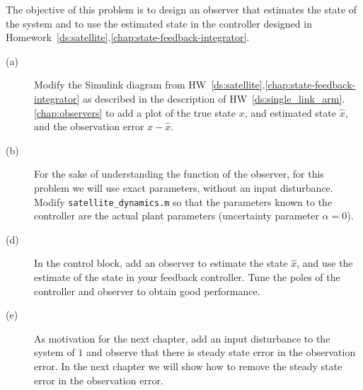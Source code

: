 
The objective of this problem is to design an observer that estimates the state of the system and to use the estimated state in the controller designed in Homework~\ref{ds:satellite}.\ref{chap:state-feedback-integrator}.
\begin{description}\item[]
\item[(a)] Modify the Simulink diagram from HW~\ref{ds:satellite}.\ref{chap:state-feedback-integrator} as described in the description of HW~\ref{ds:single_link_arm}.\ref{chap:observers} to add a plot of the true state $x$, and estimated state $\hat{x}$, and the observation error $x-\hat{x}$.
\item[(b)] For the sake of understanding the function of the observer, for this problem we will use exact parameters, without an input disturbance.  Modify {\tt  satellite\_dynamics.m} so that the parameters known to the controller are the actual plant parameters (uncertainty parameter $\alpha=0$).
\item[(d)] In the control block, add an observer to estimate the state $\hat{x}$, and use the estimate of the state in your feedback controller.
Tune the poles of the controller and observer to obtain good performance.  
\item[(e)] As motivation for the next chapter, add an input disturbance to the system of $1$ and observe that there is steady state error in the observation error.  In the next chapter we will show how to remove the steady state error in the observation error.
\end{description}

